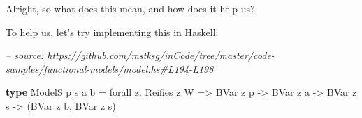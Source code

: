 \documentclass[]{article}
\newenvironment{Shaded}{}{}
\newcommand{\CommentTok}[1]{\textcolor[rgb]{0.38,0.63,0.69}{\textit{#1}}}
\newcommand{\DataTypeTok}[1]{\textcolor[rgb]{0.56,0.13,0.00}{#1}}
\newcommand{\FunctionTok}[1]{\textcolor[rgb]{0.02,0.16,0.49}{#1}}
\newcommand{\KeywordTok}[1]{\textcolor[rgb]{0.00,0.44,0.13}{\textbf{#1}}}
\newcommand{\NormalTok}[1]{#1}
\newcommand{\OtherTok}[1]{\textcolor[rgb]{0.00,0.44,0.13}{#1}}
\begin{document}
Alright, so what does this mean, and how does it help us?

To help us, let's try implementing this in Haskell:

\begin{Shaded}
\begin{Highlighting}[]
\CommentTok{-- source: https://github.com/mstksg/inCode/tree/master/code-samples/functional-models/model.hs#L194-L198}

\KeywordTok{type} \DataTypeTok{ModelS}\NormalTok{ p s a b }\FunctionTok{=}\NormalTok{ forall z}\FunctionTok{.} \DataTypeTok{Reifies}\NormalTok{ z }\DataTypeTok{W}
                   \OtherTok{=>} \DataTypeTok{BVar}\NormalTok{ z p}
                   \OtherTok{->} \DataTypeTok{BVar}\NormalTok{ z a}
                   \OtherTok{->} \DataTypeTok{BVar}\NormalTok{ z s}
                   \OtherTok{->}\NormalTok{ (}\DataTypeTok{BVar}\NormalTok{ z b, }\DataTypeTok{BVar}\NormalTok{ z s)}
\end{Highlighting}
\end{Shaded}
\end{document}
